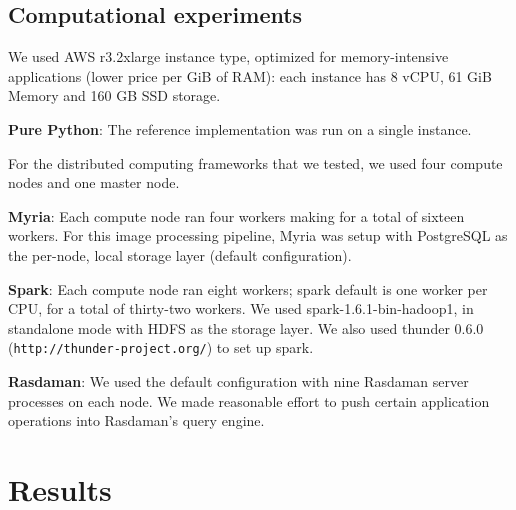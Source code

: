 \documentclass[a0,landscape]{a0poster}
\begin{document}
\begin{multicols}{3}
\subsection*{Computational experiments}
We used AWS r3.2xlarge instance type, optimized for memory-intensive applications (lower price per GiB of RAM): each instance has 8 vCPU, 61 GiB Memory and 160 GB SSD storage.

\textbf{Pure Python}: The reference implementation was run on a single instance.

For the distributed computing frameworks that we tested, we used four compute
nodes and one master node.

\textbf{Myria}:   Each compute node ran four workers making for a total of sixteen workers. For this image processing pipeline, Myria was setup with PostgreSQL as the per-node, local storage layer (default configuration).

\textbf{Spark}: Each compute node ran eight workers; spark default is one worker
per CPU, for a total of thirty-two workers. We used spark-1.6.1-bin-hadoop1, in
standalone mode with HDFS as the storage layer. We also used thunder 0.6.0
(\texttt{http://thunder-project.org/}) to set up spark.

\textbf{Rasdaman}: We used the default configuration with  nine Rasdaman server processes on each node. We made reasonable effort to push certain application operations into Rasdaman’s query engine.


\section*{Results}


\end{multicols}
\end{document}
